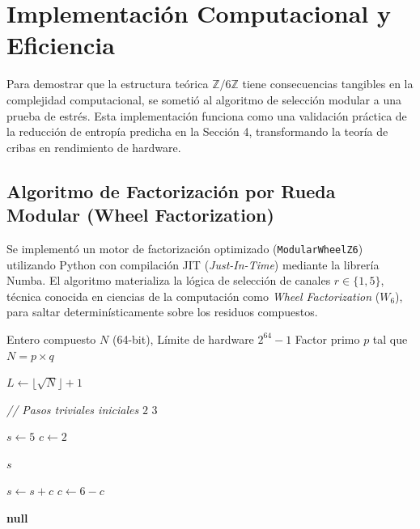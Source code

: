 \documentclass[12pt, a4paper]{article}
\theoremstyle{plain}
\theoremstyle{definition}
\newcommand{\Z}{\mathbb{Z}}
\begin{document}
\section{Implementación Computacional y Eficiencia}

Para demostrar que la estructura teórica $\Z/6\Z$ tiene consecuencias tangibles en la complejidad computacional, se sometió al algoritmo de selección modular a una prueba de estrés. Esta implementación funciona como una validación práctica de la reducción de entropía predicha en la Sección 4, transformando la teoría de cribas en rendimiento de hardware.

\subsection{Algoritmo de Factorización por Rueda Modular (Wheel Factorization)}

Se implementó un motor de factorización optimizado (\texttt{ModularWheelZ6}) utilizando Python con compilación JIT (\textit{Just-In-Time}) mediante la librería Numba. El algoritmo materializa la lógica de selección de canales $r \in \{1, 5\}$, técnica conocida en ciencias de la computación como \textit{Wheel Factorization} ($W_6$), para saltar determinísticamente sobre los residuos compuestos.

\begin{algorithm}[H]
\caption{Motor de Factorización Modular (Compilación JIT)}
\label{alg:criba_modular_jit}
\begin{algorithmic}[1]
\Require Entero compuesto $N$ (64-bit), Límite de hardware $2^{64}-1$
\Ensure Factor primo $p$ tal que $N = p \times q$

    \State $L \gets \lfloor \sqrt{N} \rfloor + 1$ 
    
    \State \textit{// Pasos triviales iniciales}
     \Return $2$ \EndIf
     \Return $3$ \EndIf

    \State $s \gets 5$ 
    \State $c \gets 2$ \Comment{Estado del ciclo de salto $\Z/6\Z$}

            \State \Return $s$ 
        \EndIf

        \State $s \gets s + c$ 
        \State $c \gets 6 - c$ 
    \EndWhile

    \State \Return \textbf{null} 
\EndFunction
\end{algorithmic}
\end{algorithm}
\end{document}
